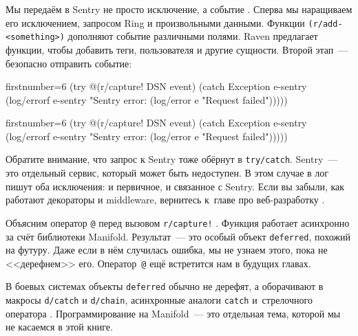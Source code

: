 \fi

\wavebottom

Мы передаём в Sentry не просто исключение, а событие . Сперва мы
наращиваем его исключением, запросом Ring и произвольными данными. Функции
\verb|(r/add-<something>)| дополняют событие различными полями. Raven предлагает
функции, чтобы добавить теги, пользователя и другие сущности. Второй этап~---
безопасно отправить событие:

\wavetop

\ifx\DEVICETYPE\MOBILE

\begin{english}
  \begin{clojure/lines*}{firstnumber=6}
(try
  @(r/capture! DSN event)
  (catch Exception e-sentry
    (log/errorf
      e-sentry "Sentry error: %
    (log/error e "Request failed")))))
  \end{clojure/lines*}
\end{english}

\else

\begin{english}
  \begin{clojure/lines*}{firstnumber=6}
    (try
      @(r/capture! DSN event)
      (catch Exception e-sentry
        (log/errorf e-sentry "Sentry error: %
        (log/error e "Request failed")))))
  \end{clojure/lines*}
\end{english}

\fi

Обратите внимание, что запрос к Sentry тоже обёрнут в \verb|try/catch|. Sentry~---
это отдельный сервис, который может быть недоступен. В этом случае в лог пишут
оба исключения: и первичное, и связанное с Sentry. Если вы забыли, как работают
декораторы и middleware, вернитесь к~главе про веб-разработку .


\mnoindent
Объясним оператор \verb|@| перед вызовом \verb|r/capture!| .
Функция работает асинхронно за счёт библиотеки Manifold. Результат~--- это особый
объект \verb|deferred|, похожий на футуру. Даже если в нём случилась ошибка, мы
не узнаем этого, пока не <<дерефнем>> его. Оператор~\verb|@| ещё встретится нам
в будущих главах.

В боевых системах объекты \verb|deferred| обычно не дерефят, а оборачивают в
макросы \verb|d/catch| и \verb|d/chain|, асинхронные аналоги \verb|catch|
и~стрелочного оператора \arr{}. Программирование на Manifold~--- это
отдельная тема, которой мы не касаемся в этой книге.

